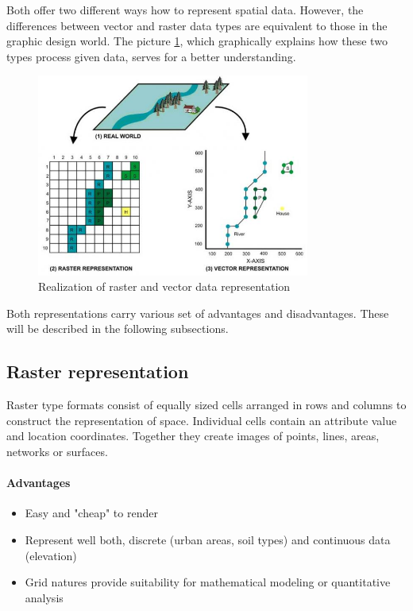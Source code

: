 \documentclass[thesis=M,english]{FITthesis}[2012/10/20]
\begin{document}
Both offer two different ways how to represent spatial data. However, the differences between vector and raster data types are equivalent to those in the graphic design world. The picture \ref{pic:RasterVector}, which graphically explains how these two types process given data, serves for a better understanding.

\begin{figure}[h]
\centering
\includegraphics[width=0.8\textwidth]{pics/RasterVectorPreview}
\caption{Realization of raster and vector data representation}
\label{pic:RasterVector}
\end{figure}

Both representations carry various set of advantages and disadvantages. These will be described in the following subsections.

\subsection{Raster representation}
Raster type formats consist of equally sized cells arranged in rows and columns to construct the representation of space. Individual cells contain an attribute value and location coordinates. Together they create images of points, lines, areas, networks or surfaces.

\paragraph*{Advantages}
\begin{itemize}[noitemsep]
\item Easy and "cheap" to render
\item Represent well both, discrete (urban areas, soil types) and continuous data (elevation)
\item Grid natures provide suitability for mathematical modeling or quantitative analysis
\end{itemize}
\end{document}
